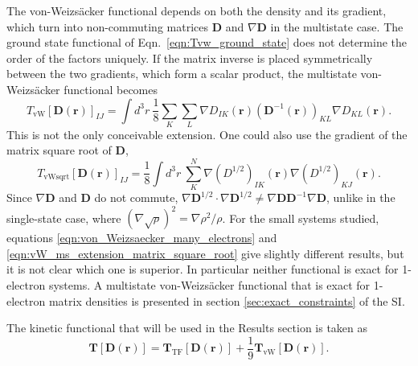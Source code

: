 \documentclass[journal=jpclcd,manuscript=letter]{achemso}
\newcommand\m[1]{\mathbf{#1}}
\renewcommand\vec[1]{\mathbf{#1}}
\begin{document}
The von-Weizs\"{a}cker functional depends on both the density and its gradient,
which turn into non-commuting matrices $\m{D}$ and $\nabla \m{D}$ in the multistate case.
The ground state functional of Eqn.~\ref{eqn:Tvw_ground_state} does not determine the order of the factors uniquely.
If the matrix inverse is placed symmetrically between the two gradients, which form a scalar product, the
multistate von-Weizs\"{a}cker functional becomes
\begin{equation}
  T_{\text{vW}}[\m{D}(\vec{r})]_{IJ} = \int d^3\!r ~ \frac{1}{8} \sum_{K} \sum_{L} \nabla D_{IK}(\vec{r}) \left(\m{D}^{-1}(\vec{r}) \right)_{KL} \nabla D_{KL}(\vec{r}).
  \label{eqn:von_Weizsaecker_many_electrons}
\end{equation}
This is not the only conceivable extension. One could also use the gradient of the matrix square root of $\m{D}$,
\begin{equation}
T_{\text{vWsqrt}}[\m{D}(\vec{r})]_{IJ} 
= \frac{1}{8} \int d^3\!r ~ \sum_{K}^N \nabla (D^{1/2})_{IK}(\vec{r}) \nabla (D^{1/2})_{KJ}(\vec{r}).
\label{eqn:vW_ms_extension_matrix_square_root}
\end{equation}
Since $\nabla \m{D}$ and $\m{D}$ do not commute,
$\nabla \m{D}^{1/2} \cdot \nabla \m{D}^{1/2} \neq \nabla \m{D} \m{D}^{-1} \nabla \m{D}$,
unlike in the single-state case, where $\left(\nabla \sqrt{\rho}\right)^2 = \nabla \rho^2 / \rho$.
For the small systems studied, equations \ref{eqn:von_Weizsaecker_many_electrons} and \ref{eqn:vW_ms_extension_matrix_square_root}
give slightly different results, but it is not clear which one is superior.
In particular neither functional is exact for 1-electron systems. A multistate von-Weizs\"{a}cker functional that is exact for
1-electron matrix densities is presented in section \ref{sec:exact_constraints} of the SI.

The kinetic functional that will be used in the Results section is taken as
\begin{equation}
\m{T}[\m{D}(\vec{r})] = \m{T}_{\text{TF}}[\m{D}(\vec{r})] + \frac{1}{9} \m{T}_{\text{vW}}[\m{D}(\vec{r})]. \label{eqn:kinetic_energy_msdft}
\end{equation}

\end{document}
